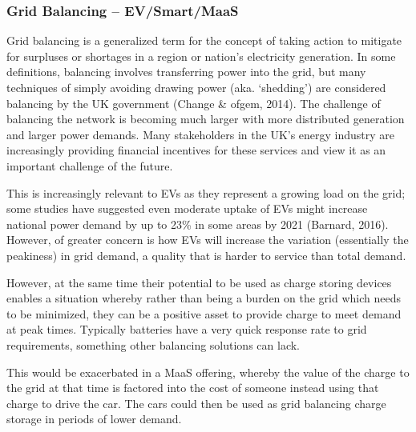 \documentclass[journal]{IEEEtran}
\begin{document}
\subsubsection{Grid Balancing -- EV/Smart/MaaS} 

Grid balancing is a generalized term for the concept of taking action
to mitigate for surpluses or shortages in a region or nation’s
electricity generation. In some definitions, balancing involves
transferring power into the grid, but many techniques of simply
avoiding drawing power (aka. `shedding') are considered balancing by
the UK government (Change \& ofgem, 2014). The challenge of balancing
the network is becoming much larger with more distributed generation
and larger power demands. Many stakeholders in the UK’s energy
industry are increasingly providing financial incentives for these
services and view it as an important challenge of the future.

This is increasingly relevant to EVs as they represent a growing load
on the grid; some studies have suggested even moderate uptake of EVs
might increase national power demand by up to 23\% in some areas by
2021 (Barnard, 2016). However, of greater concern is how EVs will
increase the variation (essentially the peakiness) in grid demand, a
quality that is harder to service than total demand.

However, at the same time their potential to be used as charge storing
devices enables a situation whereby rather than being a burden on the
grid which needs to be minimized, they can be a positive asset to
provide charge to meet demand at peak times. Typically batteries have
a very quick response rate to grid requirements, something other
balancing solutions can lack.

This would be exacerbated in a MaaS offering, whereby the value of the
charge to the grid at that time is factored into the cost of someone
instead using that charge to drive the car. The cars could then be
used as grid balancing charge storage in periods of lower demand.



\end{document}
